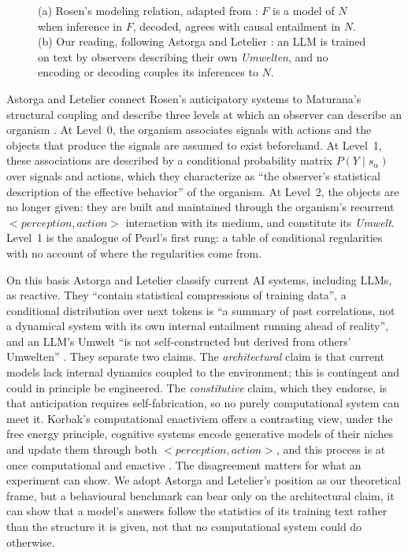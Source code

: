\documentclass{llncs}
\begin{document}
\begin{figure}[t]
  \centering
  
  \caption{(a) Rosen's modeling relation, adapted from \cite[Fig.~2.1]{rosen2012anticipatory}:
  $F$ is a model of $N$ when inference in $F$, decoded, agrees with causal
  entailment in $N$. (b) Our reading, following Astorga and Letelier
  \cite{astorga2026anticipation}: an LLM is trained on text by observers
  describing their own \emph{Umwelten}, and no encoding or decoding couples
  its inferences to $N$.}
  \label{fig:rosen}
\end{figure}


Astorga and Letelier connect Rosen's anticipatory systems to Maturana's structural coupling and describe three levels at which an observer can describe an organism \cite{astorga2026anticipation}. At Level~0, the organism associates signals with actions and the objects that produce the signals are assumed to exist beforehand. At Level~1, these associations are described by a conditional probability matrix $P(Y \mid s_\alpha)$ over signals and actions, which they characterize as ``the observer's statistical description of the effective behavior'' of the organism. At Level~2, the objects are no longer given: they are built and maintained through the organism's recurrent $<perception,action>$ interaction with its medium, and constitute its \emph{Umwelt}. Level~1 is the analogue of Pearl's first rung: a table of conditional regularities with no account of where the regularities come from.

On this basis Astorga and Letelier classify current AI systems, including LLMs, as reactive. They ``contain statistical compressions of training data'', a conditional distribution over next tokens is ``a summary of past correlations, not a dynamical system with its own internal entailment running ahead of reality'', and an LLM's Umwelt ``is not self-constructed but derived from others' Umwelten'' \cite{astorga2026anticipation}. They separate two claims. The \emph{architectural} claim is that current models lack internal dynamics coupled to the environment; this is contingent and could in principle be engineered. The \emph{constitutive} claim, which they endorse, is that anticipation requires self-fabrication, so no purely computational system can meet it. Korbak's computational enactivism offers a contrasting view, under the free energy principle, cognitive systems encode generative models of their niches and update them through both $<perception,action>$, and this process is at once computational and enactive \cite{korbak2021computational}. The disagreement matters for what an experiment can show. We adopt Astorga and Letelier's position as our theoretical frame, but a behavioural benchmark can bear only on the architectural claim, it can show that a model's answers follow the statistics of its training text rather than the structure it is given, not that no computational system could do otherwise.
\end{document}
